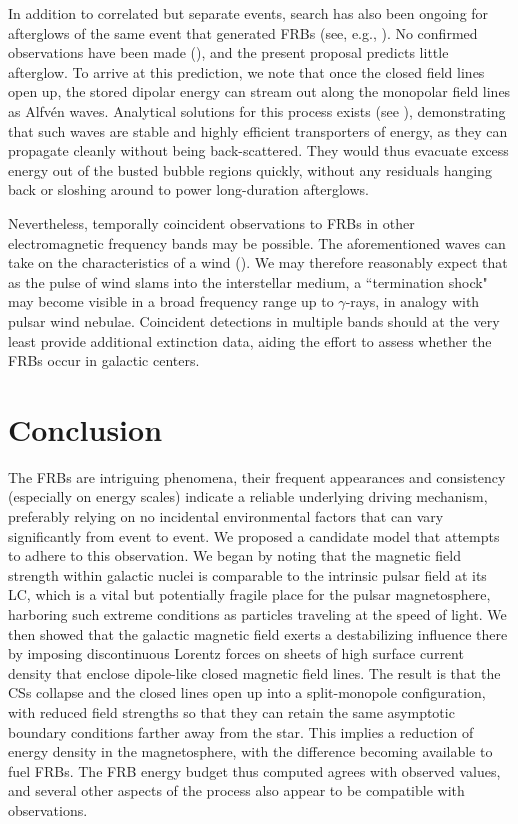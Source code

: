 \documentclass{aa}
\begin{document}
In addition to correlated but separate events, search has also been ongoing for afterglows of the same event that generated FRBs (see, e.g., \cite{Keane:2016yyk}). No confirmed observations have been made (\cite{2016ApJ...821L..22W}), and the present proposal predicts little afterglow. 
To arrive at this prediction, we note that once the closed field lines open up, the stored dipolar energy can stream out along the monopolar field lines as Alfv\'en waves. Analytical solutions for this process exists (see \cite{Brennan:2013jla,2014PhRvD..89j3013B,Zhang:2015aga}), demonstrating that such waves are stable and highly efficient transporters of energy, as they can propagate cleanly without being back-scattered. They would thus evacuate excess energy out of the busted bubble regions quickly, without any residuals hanging back or sloshing around to power long-duration afterglows. 

Nevertheless, temporally coincident observations to FRBs in other electromagnetic frequency bands may be possible. The aforementioned waves can take on the characteristics of a wind (\cite{Brennan:2013jla}). We may therefore reasonably expect that as the pulse of wind slams into the interstellar medium, a ``termination shock" may become visible in a broad frequency range up to $\gamma$-rays, in analogy with pulsar wind nebulae. Coincident detections in multiple bands should at the very least provide additional extinction data, aiding the effort to assess whether the FRBs occur in galactic centers. 




\section{Conclusion} \label{sec:Con}
The FRBs are intriguing phenomena, their frequent appearances and consistency (especially on energy scales) indicate a reliable underlying driving mechanism, preferably relying on no incidental environmental factors that can vary significantly from event to event. We proposed a candidate model that attempts to adhere to this observation. We began by noting that the magnetic field strength within galactic nuclei is comparable to the intrinsic pulsar field at its LC, which is a vital but potentially fragile place for the pulsar magnetosphere, harboring such extreme conditions as particles traveling at the speed of light.
We then showed that the galactic magnetic field exerts a destabilizing influence there by imposing discontinuous Lorentz forces on sheets of high surface current density that enclose dipole-like closed magnetic field lines. The result is that the CSs collapse and the closed lines open up into a split-monopole configuration, with reduced field strengths so that they can retain the same asymptotic boundary conditions farther away from the star. This implies a reduction of energy density in the magnetosphere, with the difference becoming available to fuel FRBs. The FRB energy budget thus computed agrees with observed values, and several other aspects of the process also appear to be compatible with observations. 
\end{document}
